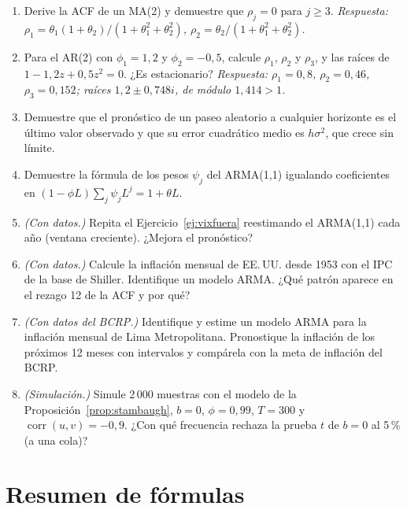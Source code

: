 \begin{enumerate}[label=\textbf{\thechapter.\arabic*},leftmargin=*,itemsep=6pt]
  \item Derive la ACF de un MA(2) y demuestre que $\rho_j=0$ para $j\ge3$.
  \textit{Respuesta: $\rho_1=\theta_1(1+\theta_2)/(1+\theta_1^2+\theta_2^2)$, $\rho_2=\theta_2/(1+\theta_1^2+\theta_2^2)$.}

  \item Para el AR(2) con $\phi_1=1{,}2$ y $\phi_2=-0{,}5$, calcule $\rho_1$, $\rho_2$ y $\rho_3$, y las raíces de
  $1-1{,}2z+0{,}5z^2=0$. ¿Es estacionario? \textit{Respuesta: $\rho_1=0{,}8$, $\rho_2=0{,}46$, $\rho_3=0{,}152$;
  raíces $1{,}2\pm0{,}748i$, de módulo $1{,}414>1$.}

  \item Demuestre que el pronóstico de un paseo aleatorio a cualquier horizonte es el último valor observado y
  que su error cuadrático medio es $h\sigma^2$, que crece sin límite.

  \item Demuestre la fórmula de los pesos $\psi_j$ del ARMA(1,1) igualando coeficientes en
  $(1-\phi L)\sum_j\psi_jL^j=1+\theta L$.

  \item \emph{(Con datos.)} Repita el Ejercicio~\ref{ej:vixfuera} reestimando el ARMA(1,1) cada año (ventana
  creciente). ¿Mejora el pronóstico?

  \item \emph{(Con datos.)} Calcule la inflación mensual de EE.\,UU. desde 1953 con el IPC de la base de Shiller.
  Identifique un modelo ARMA. ¿Qué patrón aparece en el rezago 12 de la ACF y por qué?

  \item \emph{(Con datos del BCRP.)} Identifique y estime un modelo ARMA para la inflación mensual de Lima
  Metropolitana. Pronostique la inflación de los próximos 12 meses con intervalos y compárela con la meta de
  inflación del BCRP.

  \item \emph{(Simulación.)} Simule 2\,000 muestras con el modelo de la Proposición~\ref{prop:stambaugh},
  $b=0$, $\phi=0{,}99$, $T=300$ y $\operatorname{corr}(u,v)=-0{,}9$. ¿Con qué frecuencia rechaza la prueba $t$
  de $b=0$ al 5\,\% (a una cola)?
\end{enumerate}

\section{Resumen de fórmulas}

